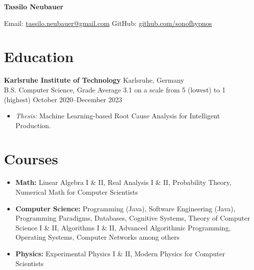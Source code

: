 \documentclass[letterpaper,9pt]{article}
\begin{document}
\begin{center}
\Huge\textbf{Tassilo Neubauer}

\vspace{0.5em}
\large
\textcolor{accent}{Email:} \href{tassilo.neubauer@gmail.com}{tassilo.neubauer@gmail.com} \hspace{2em}
\textcolor{accent}{GitHub:} \href{https://github.com/sonofhypnos}{github.com/sonofhypnos}
\end{center}

\section*{Education}
\textbf{Karlsruhe Institute of Technology} \hfill Karlsruhe, Germany \\
B.S. Computer Science, Grade Average 3.1 on a scale from 5 (lowest) to 1 (highest) \hfill October 2020--December 2023
\begin{itemize}
    \item \textit{Thesis:} Machine Learning-based Root Cause Analysis for Intelligent Production.
\end{itemize}

\section*{Courses}
\begin{itemize}
    \item \textbf{Math:} Linear Algebra I \& II, Real Analysis I \& II, Probability Theory, Numerical Math for Computer Scientists
    \item \textbf{Computer Science:} Programming (Java), Software Engineering (Java), Programming Paradigms, Databases, Cognitive Systems, Theory of Computer Science I \& II, Algorithms I \& II, Advanced Algorithmic Programming, Operating Systems, Computer Networks among others
    \item \textbf{Physics:} Experimental Physics I \& II, Modern Physics for Computer Scientists
\end{itemize}
\end{document}
